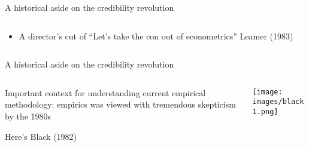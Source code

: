 \documentclass[notes,11pt, aspectratio=169]{beamer}
\newenvironment{wideitemize}{\itemize\addtolength{\itemsep}{10pt}}{\enditemize}
\begin{document}
\begin{frame}{A historical aside on the credibility revolution}
\begin{columns}[T] %
  \begin{column}{.4\textwidth}
    \begin{itemize}
    \item A director's cut of ``Let's take the con out of econometrics'' Leamer (1983)
    \end{itemize}
\end{column}%
\hfill%
\begin{column}{.6\textwidth}
  \vspace{-8pt}
  \begin{center}
  \end{center}
\end{column}%
\end{columns}
\end{frame}

\begin{frame}{A historical aside on the credibility revolution}
\begin{columns}[T] %
  \begin{column}{.4\textwidth}
    \begin{wideitemize}
    \item Important context for understanding current empirical
      methodology: empirics was viewed with tremendous skepticism by the 1980s
    \item Here's Black (1982)
    \end{wideitemize}
\end{column}%
\hfill%
\begin{column}{.6\textwidth}
    \texttt{[image: images/black1.png]}\\
\end{column}%
\end{columns}
\end{frame}
\end{document}
